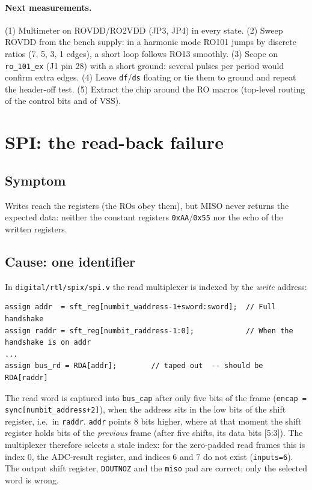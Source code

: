\documentclass[10pt,a4paper]{article}
\begin{document}
\paragraph{Next measurements.} (1) Multimeter on ROVDD/RO2VDD (JP3, JP4) in every state. (2) Sweep ROVDD
from the bench supply: in a harmonic mode RO101 jumps by discrete ratios (7, 5, 3, 1 edges), a short loop
follows RO13 smoothly. (3) Scope on \texttt{ro\_101\_ex} (J1 pin 28) with a short ground: several pulses
per period would confirm extra edges. (4) Leave \texttt{df}/\texttt{ds} floating or tie them to ground
and repeat the header-off test. (5) Extract the chip around the RO macros (top-level routing of the
control bits and of VSS).

\section{SPI: the read-back failure}
\label{sec:spi}
\subsection{Symptom}
Writes reach the registers (the ROs obey them), but MISO never returns the expected data: neither the
constant registers \texttt{0xAA}/\texttt{0x55} nor the echo of the written registers.

\subsection{Cause: one identifier}
In \nolinkurl{digital/rtl/spix/spi.v} the read multiplexer is indexed by the \emph{write} address:
\begin{lstlisting}
assign addr  = sft_reg[numbit_waddress-1+sword:sword];  // Full handshake
assign raddr = sft_reg[numbit_raddress-1:0];            // When the handshake is on addr
...
assign bus_rd = RDA[addr];        // taped out  -- should be RDA[raddr]
\end{lstlisting}
The read word is captured into \texttt{bus\_cap} after only five bits of the frame
(\texttt{encap = sync[numbit\_address+2]}), when the address sits in the low bits of the shift register,
i.e.\ in \texttt{raddr}. \texttt{addr} points 8 bits higher, where at that moment the shift register holds
bits of the \emph{previous} frame (after five shifts, its data bits [5:3]). The multiplexer therefore
selects a stale index: for the zero-padded read frames this is index 0, the ADC-result register, and
indices 6 and 7 do not exist (\texttt{inputs=6}). The output shift register, \texttt{DOUTNOZ} and the
\texttt{miso} pad are correct; only the selected word is wrong.
\end{document}
